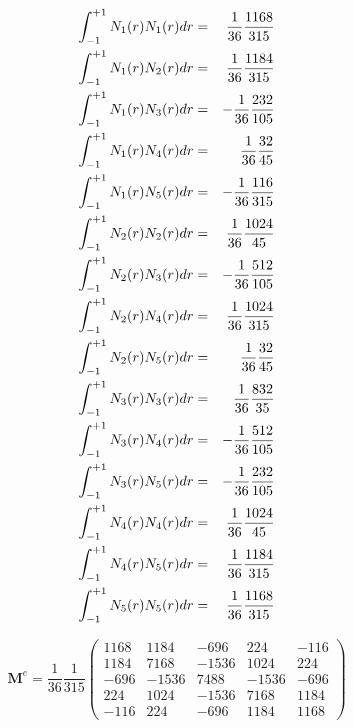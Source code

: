 \begin{eqnarray}
\int_{-1}^{+1} N_1(r) N_1(r) dr &=& \frac{1}{36}\frac{1168}{315} \nonumber\\ 
\int_{-1}^{+1} N_1(r) N_2(r) dr &=& \frac{1}{36}\frac{1184}{315} \nonumber\\ 
\int_{-1}^{+1} N_1(r) N_3(r) dr &=&-\frac{1}{36}\frac{232}{105}  \nonumber\\ 
\int_{-1}^{+1} N_1(r) N_4(r) dr &=& \frac{1}{36}\frac{32}{45}    \nonumber\\ 
\int_{-1}^{+1} N_1(r) N_5(r) dr &=&-\frac{1}{36}\frac{116}{315}  \nonumber\\ 
\int_{-1}^{+1} N_2(r) N_2(r) dr &=& \frac{1}{36}\frac{1024}{45}  \nonumber\\ 
\int_{-1}^{+1} N_2(r) N_3(r) dr &=&-\frac{1}{36}\frac{512}{105}  \nonumber\\ 
\int_{-1}^{+1} N_2(r) N_4(r) dr &=& \frac{1}{36}\frac{1024}{315} \nonumber\\ 
\int_{-1}^{+1} N_2(r) N_5(r) dr &=& \frac{1}{36}\frac{32}{45}    \nonumber\\ 
\int_{-1}^{+1} N_3(r) N_3(r) dr &=& \frac{1}{36}\frac{832}{35}    \nonumber\\ 
\int_{-1}^{+1} N_3(r) N_4(r) dr &=& -\frac{1}{36}\frac{512}{105}    \nonumber\\ 
\int_{-1}^{+1} N_3(r) N_5(r) dr &=& -\frac{1}{36}\frac{232}{105}    \nonumber\\ 
\int_{-1}^{+1} N_4(r) N_4(r) dr &=& \frac{1}{36}\frac{1024}{45}    \nonumber\\ 
\int_{-1}^{+1} N_4(r) N_5(r) dr &=& \frac{1}{36}\frac{1184}{315}    \nonumber\\ 
\int_{-1}^{+1} N_5(r) N_5(r) dr &=& \frac{1}{36}\frac{1168}{315}    
\end{eqnarray}


\begin{equation}
{\bm M}^e
=\frac{1}{36}
\frac{1}{315}
\left(
\begin{array}{ccccc}
1168 & 1184 & -696 & 224 & -116 \\
1184 & 7168   & -1536  &  1024 &  224 \\
-696 & -1536 & 7488  & -1536  & -696  \\
224   & 1024 & -1536 & 7168 & 1184 \\
-116 & 224   & -696 & 1184 & 1168
\end{array}
\right)
\end{equation}

